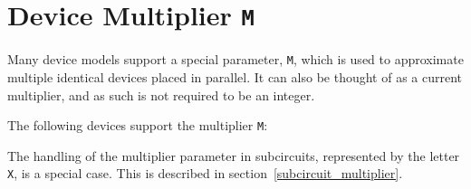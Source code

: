 \section{Device Multiplier \texttt{M}}
\label{device_multiplier}

Many device models support a special parameter, \texttt{M}, which is used to approximate 
multiple identical devices placed in parallel.  It can also be thought of as a current multiplier, 
and as such is not required to be an integer.

The following devices support the multiplier \texttt{M}:


The handling of the multiplier parameter in subcircuits, represented by the letter \texttt{X}, 
is a special case.  This is described in section~\ref{subcircuit_multiplier}.


